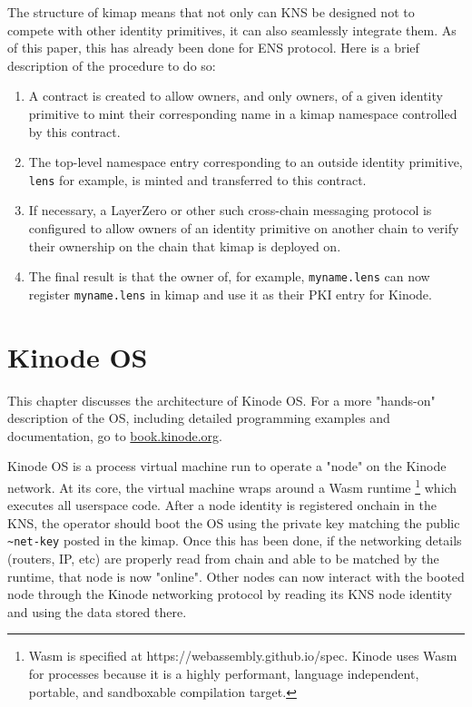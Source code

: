 \documentclass[runningheads]{llncs}
\begin{document}
The structure of kimap means that not only can KNS be designed not to compete with other identity primitives, it can also seamlessly integrate them.
As of this paper, this has already been done for ENS protocol.
Here is a brief description of the procedure to do so:
\begin{enumerate}
    \item A contract is created to allow owners, and only owners, of a given identity primitive to mint their corresponding name in a kimap namespace controlled by this contract.
    \item The top-level namespace entry corresponding to an outside identity primitive, \verb|lens| for example, is minted and transferred to this contract.
    \item If necessary, a LayerZero or other such cross-chain messaging protocol is configured to allow owners of an identity primitive on another chain to verify their ownership on the chain that kimap is deployed on.
    \item The final result is that the owner of, for example, \verb|myname.lens| can now register \verb|myname.lens| in kimap and use it as their PKI entry for Kinode.
\end{enumerate}

\section{Kinode OS}

This chapter discusses the architecture of Kinode OS. For a more "hands-on" description of the OS, including detailed programming examples and documentation, go to \href{https://book.kinode.org/}{book.kinode.org}.

Kinode OS is a process virtual machine run to operate a "node" on the Kinode network.
At its core, the virtual machine wraps around a Wasm runtime
\footnote{Wasm is specified at https://webassembly.github.io/spec. Kinode uses Wasm for processes because it is a highly performant, language independent, portable, and sandboxable compilation target.}
which executes all userspace code.
After a node identity is registered onchain in the KNS, the operator should boot the OS using the private key matching the public \verb|~net-key| posted in the kimap.
Once this has been done, if the networking details (routers, IP, etc) are properly read from chain and able to be matched by the runtime, that node is now "online".
Other nodes can now interact with the booted node through the Kinode networking protocol by reading its KNS node identity and using the data stored there.
\end{document}

